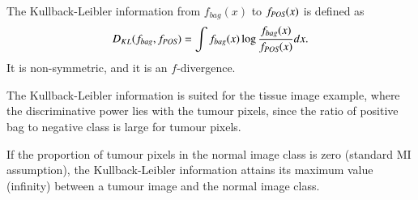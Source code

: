 The Kullback-Leibler information from $f_{bag}(x)$ to $f_{\text{\scriptsize{{\it POS}}}}(x)$ is defined as
\begin{align}
  D_{KL}(f_{bag},f_{\text{\scriptsize{{\it POS}}}}) = \int f_{bag}(x) \log \frac{f_{bag}(x)}{f_{\text{\scriptsize{{\it POS}}}} (x)} dx.
\end{align}
It is non-symmetric, and it is an $f$-divergence. 

The Kullback-Leibler information is suited for the tissue image example, where the discriminative power lies with the tumour pixels, since the ratio of positive bag to negative class is large for tumour pixels. 

If the proportion of tumour pixels in the normal image class is zero (standard MI assumption), the Kullback-Leibler information attains its maximum value (infinity) between a tumour image and the normal image class. 





